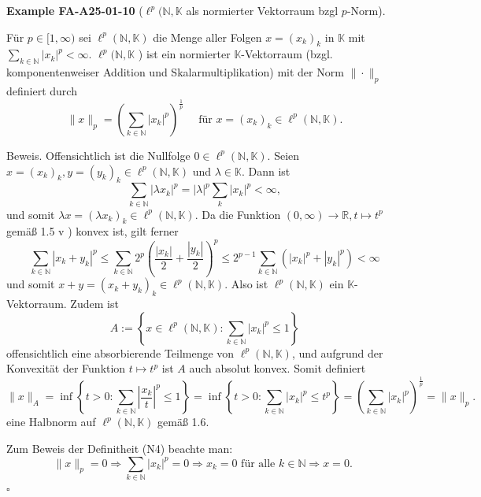 \documentclass[10pt, letterpaper]{article}
\newcommand{\CustomHeading}[3]{%
  \par\medskip\noindent%
  \textbf{#1 #2} \textnormal{(#3)}.\enskip%
}
\newenvironment{EXA}[2]{\begin{unitbox}\CustomHeading{Example}{#1}{#2}}{\end{unitbox}}
\begin{document}
\begin{EXA}{FA-A25-01-10}{$\ell^{p}(\mathbb{N}, \mathbb{K}$ als normierter Vektorraum bzgl $p$-Norm}
Für $p \in[1, \infty)$ sei $\ell^{p}(\mathbb{N}, \mathbb{K})$ die Menge aller Folgen $x=\left(x_{k}\right)_{k}$ in $\mathbb{K}$ mit $\sum_{k \in \mathbb{N}}\left|x_{k}\right|^{p}<\infty$. $\ell^{p}(\mathbb{N}, \mathbb{K}$ ) ist ein normierter $\mathbb{K}$-Vektorraum (bzgl. komponentenweiser Addition und Skalarmultiplikation) mit der Norm $\|\cdot\|_{p}$ definiert durch
$$
\|x\|_{p}=\left(\sum_{k \in \mathbb{N}}\left|x_{k}\right|^{p}\right)^{\frac{1}{p}} \quad \text { für } x=\left(x_{k}\right)_{k} \in \ell^{p}(\mathbb{N}, \mathbb{K}) .
$$


Beweis. Offensichtlich ist die Nullfolge $0 \in \ell^{p}(\mathbb{N}, \mathbb{K})$. Seien $x=\left(x_{k}\right)_{k}, y=\left(y_{k}\right)_{k} \in \ell^{p}(\mathbb{N}, \mathbb{K})$ und $\lambda \in \mathbb{K}$. Dann ist
$$
\sum_{k \in \mathbb{N}}\left|\lambda x_{k}\right|^{p}=|\lambda|^{p} \sum_{k}\left|x_{k}\right|^{p}<\infty,
$$
und somit $\lambda x=\left(\lambda x_{k}\right)_{k} \in \ell^{p}(\mathbb{N}, \mathbb{K})$. Da die Funktion $(0, \infty) \rightarrow \mathbb{R}, t \mapsto t^{p}$ gemäß 1.5 v ) konvex ist, gilt ferner
$$
\sum_{k \in \mathbb{N}}\left|x_{k}+y_{k}\right|^{p} \leq \sum_{k \in \mathbb{N}} 2^{p}\left(\frac{\left|x_{k}\right|}{2}+\frac{\left|y_{k}\right|}{2}\right)^{p} \leq 2^{p-1} \sum_{k \in \mathbb{N}}\left(\left|x_{k}\right|^{p}+\left|y_{k}\right|^{p}\right)<\infty
$$
und somit $x+y=\left(x_{k}+y_{k}\right)_{k} \in \ell^{p}(\mathbb{N}, \mathbb{K})$. Also ist $\ell^{p}(\mathbb{N}, \mathbb{K})$ ein $\mathbb{K}$-Vektorraum. Zudem ist
$$
A:=\left\{x \in \ell^{p}(\mathbb{N}, \mathbb{K}): \sum_{k \in \mathbb{N}}\left|x_{k}\right|^{p} \leq 1\right\}
$$
offensichtlich eine absorbierende Teilmenge von $\ell^{p}(\mathbb{N}, \mathbb{K})$, und aufgrund der Konvexität der Funktion $t \mapsto t^{p}$ ist $A$ auch absolut konvex. Somit definiert
$$
\|x\|_{A}=\inf \left\{t>0: \sum_{k \in \mathbb{N}}\left|\frac{x_{k}}{t}\right|^{p} \leq 1\right\}=\inf \left\{t>0: \sum_{k \in \mathbb{N}}\left|x_{k}\right|^{p} \leq t^{p}\right\}=\left(\sum_{k \in \mathbb{N}}\left|x_{k}\right|^{p}\right)^{\frac{1}{p}}=\|x\|_{p} .
$$
eine Halbnorm auf $\ell^{p}(\mathbb{N}, \mathbb{K})$ gemäß 1.6.

Zum Beweis der Definitheit (N4) beachte man:
$$
\|x\|_{p}=0 \Longrightarrow \sum_{k \in \mathbb{N}}\left|x_{k}\right|^{p}=0 \Longrightarrow x_{k}=0 \text { für alle } k \in \mathbb{N} \Longrightarrow x=0 \text {. }
$$ \(\square\)
\end{EXA}
\end{document}
